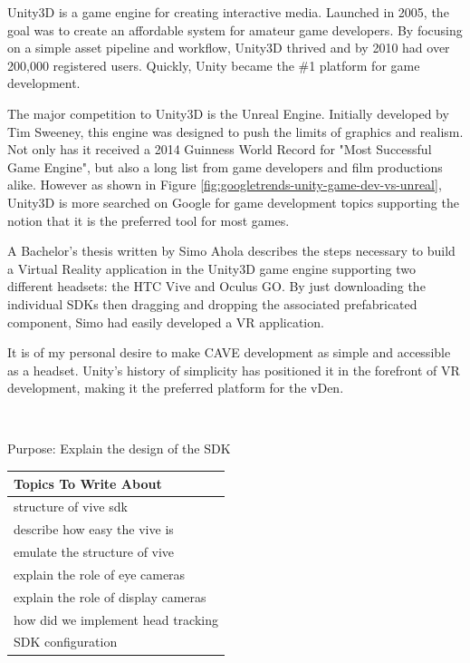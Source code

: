 \filbreak
Unity3D is a game engine for creating interactive media. Launched in 2005, the goal was to create an affordable system for amateur game developers.\cite{unityHistory} By focusing on a simple asset pipeline and workflow, Unity3D thrived and by 2010 had over 200,000 registered users. Quickly, Unity became the \#1 platform for game development. \cite{unity3ReleaseNews}

The major competition to Unity3D is the Unreal Engine. Initially developed by Tim Sweeney, this engine was designed to push the limits of graphics and realism. Not only has it received a 2014 Guinness World Record for "Most Successful Game Engine", but also a long list from game developers and film productions alike.\cite{unrealAwards} However as shown in Figure \ref{fig:googletrends-unity-game-dev-vs-unreal}, Unity3D is more searched on Google for game development topics supporting the notion that it is the preferred tool for most games. 

A Bachelor's thesis written by Simo Ahola describes the steps necessary to build a Virtual Reality application in the Unity3D game engine supporting two different headsets: the HTC Vive and Oculus GO. By just downloading the individual SDKs then dragging and dropping the associated prefabricated component, Simo had easily developed a VR application.\cite{aholaUnityVR} 

It is of my personal desire to make CAVE development as simple and accessible as a headset. Unity's history of simplicity has positioned it in the forefront of VR development, making it the preferred platform for the vDen. 


\filbreak
{}\label{sec:unitySDKSection} \\
\begin{center}
	\textcolor{OliveGreen}{Purpose: Explain the design of the SDK}
	
	\begin{table}[H]
		\centering
		\renewcommand\arraystretch{0.5}
		\begin{tabular}{|l|}
			\hline 
			Topics To Write About \\ 
			\hline 
			structure of vive sdk \\
			describe how easy the vive is  \\
			emulate the structure of vive \\  
			explain the role of eye cameras \\ 
			explain the role of display cameras \\ 
			how did we implement head tracking  \\
			SDK configuration  \\
			\hline 
		\end{tabular}
	\end{table}
\end{center}

